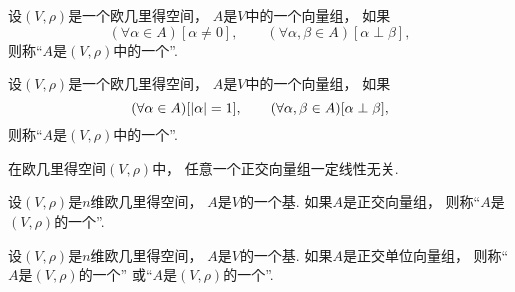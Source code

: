 \begin{definition}
设\((V,\rho)\)是一个欧几里得空间，
\(A\)是\(V\)中的一个向量组，
如果\begin{equation*}
	(\forall \alpha \in A)
	[\alpha\neq0],
	\qquad
	(\forall \alpha,\beta \in A)
	[\alpha \perp \beta],
\end{equation*}
则称“\(A\)是\((V,\rho)\)中的一个”.
\end{definition}

\begin{definition}
设\((V,\rho)\)是一个欧几里得空间，
\(A\)是\(V\)中的一个向量组，
如果\begin{equation*}
	(\forall \alpha \in A)
	[\abs{\alpha} = 1],
	\qquad
	(\forall \alpha,\beta \in A)
	[\alpha \perp \beta],
\end{equation*}
则称“\(A\)是\((V,\rho)\)中的一个”.
\end{definition}

\begin{proposition}
在欧几里得空间\((V,\rho)\)中，
任意一个正交向量组一定线性无关.
\end{proposition}

\begin{definition}
设\((V,\rho)\)是\(n\)维欧几里得空间，
\(A\)是\(V\)的一个基.
如果\(A\)是正交向量组，
则称“\(A\)是\((V,\rho)\)的一个”.
\end{definition}

\begin{definition}
设\((V,\rho)\)是\(n\)维欧几里得空间，
\(A\)是\(V\)的一个基.
如果\(A\)是正交单位向量组，
则称“\(A\)是\((V,\rho)\)的一个”
或“\(A\)是\((V,\rho)\)的一个”.
\end{definition}

